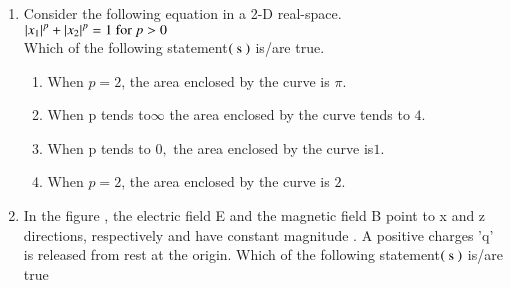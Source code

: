 \documentclass[journal]{IEEEtran}
\begin{document}
\begin{enumerate} [start=40]
\begin{enumerate}
    \item Bus 1  Slack bus\\ Bus 2  $P-\abs{V}\text{ bus }$\\Bus 3  $P-Q \text{ bus }$
    \item Bus 1  $P-\abs{V}\text{ bus }$\\Bus 2  $P-\abs{V}\text{ bus }$\\Bus 3  Slack bus
    \item Bus 3  $P-Q \text{ bus }$\\Bus 2  $P-Q \text{ bus }$\\Bus 3  Slack bus
    \item Bus 1  $P-\abs{V}\text{ bus }$\\Bus 2  $P-Q \text{ bus }$\\Bus 3  Slack bus
\end{enumerate}
\bigskip
\item Consider the following equation in a 2-D real-space.\\
$\left\vert x_{1}\right\vert^{p}+\left\vert x_{2}\right\vert^{p}=1\text{ for } p>0$\\
Which of the following statement$\left(\text{ s }\right)$ is/are true.
\begin{enumerate}
    \item When $p = 2$, the area enclosed by the curve is $\pi.$
    \item When p tends to$\infty$ the area enclosed by the curve tends to $4$.
    \item When p tends to $0,$ the area enclosed by the curve is$ 1.$
    \item When $p = 2$, the area enclosed by the curve is $2.$
\end{enumerate}
\bigskip
\item In the figure , the electric field E and the magnetic field B point to x and z directions, respectively  and have constant magnitude . A positive charges 'q' is released  from  rest at the origin. Which of the following statement$\left(\text{ s }\right)$ is/are true
\begin{figure}[!ht]
\centering
{}%


\end{figure}
\end{enumerate}
\end{document}
